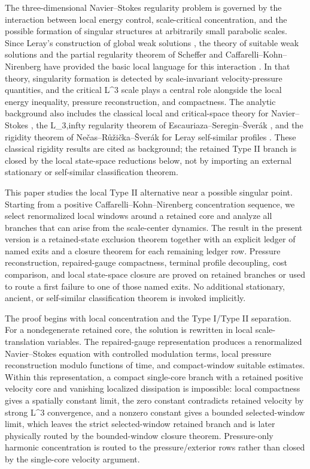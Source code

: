 \documentclass[11pt]{amsart}
\def\({}%
\def\){}%
\def\infty{infty}%
\theoremstyle{plain}
\theoremstyle{definition}
\theoremstyle{remark}
\begin{document}
The three-dimensional Navier--Stokes regularity problem is governed by the
interaction between local energy control, scale-critical concentration, and the
possible formation of singular structures at arbitrarily small parabolic
scales.  Since Leray's construction of global weak solutions
\cite{Leray1934}, the theory of suitable weak solutions and the partial
regularity theorem of Scheffer and Caffarelli--Kohn--Nirenberg have provided the
basic local language for this interaction
\cite{Scheffer1976,CaffarelliKohnNirenberg1982,Lin1998}.  In that theory,
singularity formation is detected by scale-invariant velocity-pressure
quantities, and the critical \(L^3\) scale plays a central role alongside the
local energy inequality, pressure reconstruction, and compactness.  The
analytic background also includes the classical local and critical-space
theory for Navier--Stokes
\cite{Ladyzhenskaya1969,Temam1977,ConstantinFoias1988,Kato1984,LemarieRieusset2002},
the \(L_{3,\infty}\) regularity theorem of Escauriaza--Seregin--\v Sver\'ak
\cite{EscauriazaSereginSverak2003}, and the rigidity theorem of
Ne\v cas--R\r u\v zi\v cka--\v Sver\'ak for Leray self-similar profiles
\cite{NecasRuzickaSverak1996}.  These classical rigidity results are cited as
background; the retained Type II branch is closed by the local state-space
reductions below, not by importing an external stationary or self-similar
classification theorem.

This paper studies the local Type II alternative near a possible singular point.
Starting from a positive Caffarelli--Kohn--Nirenberg concentration sequence, we
select renormalized local windows around a retained core and analyze all
branches that can arise from the scale-center dynamics.  The result in the
present version is a retained-state exclusion theorem together with an explicit
ledger of named exits and a closure theorem for each remaining ledger row.
Pressure reconstruction, repaired-gauge compactness, terminal profile decoupling, cost
comparison, and local state-space closure are proved on retained branches or
used to route a first failure to one of those named exits.  No additional
stationary, ancient, or self-similar classification theorem is invoked
implicitly.

The proof begins with local concentration and the Type I/Type II separation.
For a nondegenerate retained core, the solution is rewritten in local
scale-translation variables.  The repaired-gauge representation produces a
renormalized Navier--Stokes equation with controlled modulation terms, local
pressure reconstruction modulo functions of time, and compact-window suitable
estimates.  Within this representation, a compact single-core branch with a
retained positive velocity core and vanishing localized dissipation is
impossible: local compactness gives a spatially constant limit, the zero
constant contradicts retained velocity by strong \(L^3\) convergence, and a
nonzero constant gives a bounded selected-window limit, which leaves the strict
selected-window retained branch and is later physically routed by the
bounded-window closure theorem.  Pressure-only harmonic concentration is routed to
the pressure/exterior rows rather than closed by the single-core velocity
argument.
\end{document}
